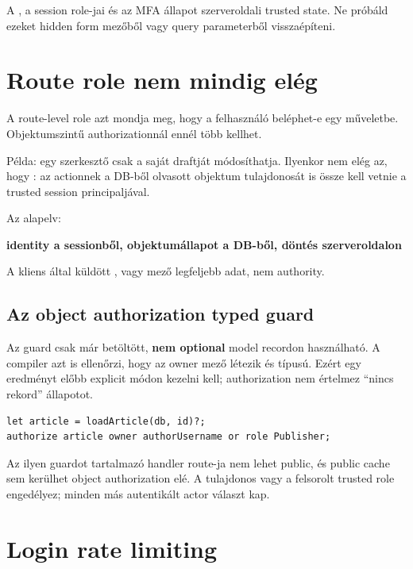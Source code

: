A , a session role-jai és az MFA állapot szerveroldali trusted state. Ne próbáld ezeket hidden form mezőből vagy query parameterből visszaépíteni.

\section{Route role nem mindig elég}

A route-level role azt mondja meg, hogy a felhasználó beléphet-e egy műveletbe. Objektumszintű authorizationnál ennél több kellhet.

Példa: egy szerkesztő csak a saját draftját módosíthatja. Ilyenkor nem elég az, hogy : az actionnek a DB-ből olvasott objektum tulajdonosát is össze kell vetnie a trusted session principaljával.

Az alapelv:

\begin{center}
\textbf{identity a sessionből, objektumállapot a DB-ből, döntés szerveroldalon}
\end{center}

A kliens által küldött ,  vagy  mező legfeljebb adat, nem authority.

\subsection*{Az object authorization typed guard}

Az  guard csak már betöltött, \textbf{nem optional} model recordon használható. A compiler azt is ellenőrzi, hogy az owner mező létezik és  típusú. Ezért egy  eredményt előbb explicit módon kezelni kell; authorization nem értelmez ``nincs rekord'' állapotot.

\begin{lstlisting}[language=RWLang]
let article = loadArticle(db, id)?;
authorize article owner authorUsername or role Publisher;
\end{lstlisting}

Az ilyen guardot tartalmazó handler route-ja nem lehet public, és public cache sem kerülhet object authorization elé. A tulajdonos vagy a felsorolt trusted role engedélyez; minden más autentikált actor  választ kap.

\section{Login rate limiting}

